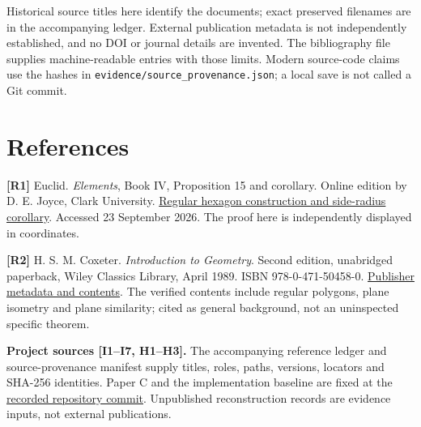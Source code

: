 \documentclass[
  11pt,
  a4paper,
]{article}
\begin{document}
Historical source titles here identify the documents; exact preserved filenames are in the accompanying ledger. External publication metadata is not independently established, and no DOI or journal details are invented. The bibliography file supplies machine-readable entries with those limits. Modern source-code claims use the hashes in \texttt{evidence/source\_provenance.json}; a local save is not called a Git commit.

\section{References}\label{references}

\begingroup\small

\textbf{{[}R1{]}} Euclid. \emph{Elements}, Book IV, Proposition 15 and corollary. Online edition by D. E. Joyce, Clark University. \href{https://mathcs.clarku.edu/~djoyce/elements/bookIV/propIV15.html}{Regular hexagon construction and side-radius corollary}. Accessed 23 September 2026. The proof here is independently displayed in coordinates.

\textbf{{[}R2{]}} H. S. M. Coxeter. \emph{Introduction to Geometry}. Second edition, unabridged paperback, Wiley Classics Library, April 1989. ISBN 978-0-471-50458-0. \href{https://www.wiley-vch.de/en/areas-interest/mathematics-statistics/introduction-to-geometry-978-0-471-50458-0}{Publisher metadata and contents}. The verified contents include regular polygons, plane isometry and plane similarity; cited as general background, not an uninspected specific theorem.

\textbf{Project sources {[}I1--I7, H1--H3{]}.} The accompanying reference ledger and source-provenance manifest supply titles, roles, paths, versions, locators and SHA-256 identities. Paper C and the implementation baseline are fixed at the \href{https://github.com/pzychozen/trioctagon-physics/tree/08c2a79739d540ffe1cab4743284052e2aa7214b}{recorded repository commit}. Unpublished reconstruction records are evidence inputs, not external publications.

\par\endgroup
\end{document}
